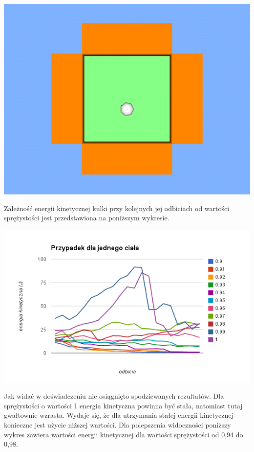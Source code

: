 \includegraphics[width=\textwidth]{./img/SimpleSnookerScene.png}

Zależność energii kinetycznej kulki przy kolejnych jej odbiciach od wartości
sprężystości jest przedstawiona na poniższym wykresie.

\includegraphics[width=\textwidth]{./img/chart_1.png}

Jak widać w doświadczeniu nie osiągnięto spodziewanych rezultatów. Dla
sprężystości o wartości 1 energia kinetyczna powinna być stała, natomiast tutaj
gwałtownie wzrasta. Wydaje się, że dla utrzymania stałej energii kinetycznej
konieczne jest użycie niższej wartości. Dla polepszenia widoczności poniższy
wykres zawiera wartości energii kinetycznej dla wartości sprężystości od 0,94 do
0,98.

